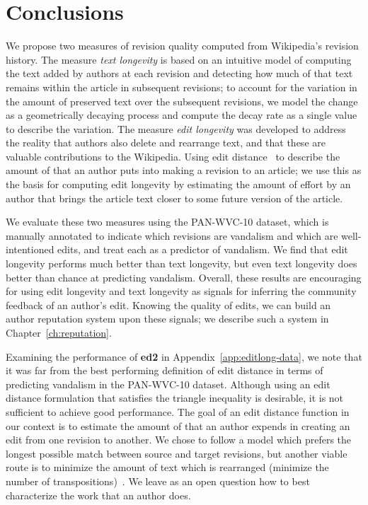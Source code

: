 \section{Conclusions}

We propose two measures of revision quality computed
from Wikipedia's revision history.
The measure \textit{text longevity} is based on an intuitive
model of computing the text added by authors at each revision
and detecting how much of that text remains within the article
in subsequent revisions; to account for the variation in
the amount of preserved text over the subsequent revisions,
we model the change as a geometrically decaying process
and compute the decay rate as a single value to describe
the variation.
The measure \textit{edit longevity} was developed to address
the reality that authors also delete and rearrange text,
and that these are valuable contributions to the Wikipedia.
Using edit distance~\cite{Levenshtein1966} to describe the
amount of  that an author puts into making a
revision to an article; we use this as the basis for computing
edit longevity by estimating the amount of effort by an
author that brings the article text closer to some future
version of the article.

We evaluate these two measures using the PAN-WVC-10 dataset, which is
manually annotated to indicate which revisions are vandalism and which
are well-intentioned edits, and treat each as a predictor of vandalism.
We find that edit longevity performs much better than text longevity,
but even text longevity does better than chance at predicting vandalism.
Overall, these results are encouraging for using edit longevity and text
longevity as signals for inferring the community feedback of an author's
edit.  Knowing the quality of edits, we can build an author reputation
system upon these signals; we describe such a system in
Chapter~\ref{ch:reputation}.

Examining the performance of \textbf{ed2} in
Appendix~\ref{app:editlong-data}, we note that it was far from the best
performing definition of edit distance in terms of predicting vandalism
in the PAN-WVC-10 dataset.
Although using an edit distance formulation that satisfies the triangle
inequality is desirable, it is not sufficient to achieve good
performance.
The goal of an edit distance function in our context is to estimate
the amount of  that an author expends in creating an
edit from one revision to another.
We chose to follow a model which prefers the longest possible match
between source and target revisions, but another viable route is to
minimize the amount of text which is rearranged (\ie minimize the
number of transpositions)~\cite{Wagner1975}.
We leave as an open question how to best characterize the work
that an author does.

